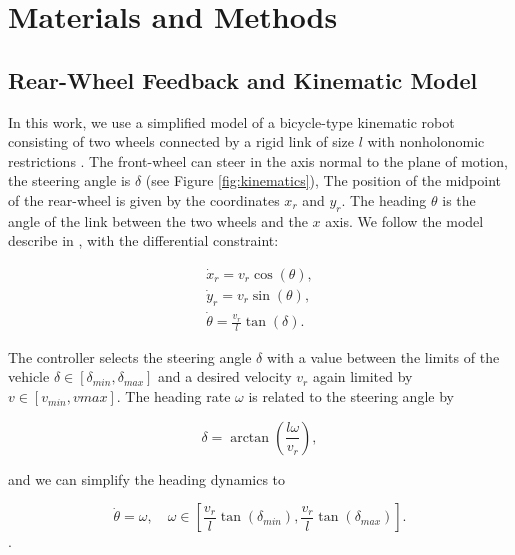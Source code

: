 \documentclass[symmetry,article,submit,moreauthors,pdftex]{Definitions/mdpi}
\begin{document}
\section{Materials and Methods}\label{MatAndMethods}

\subsection{Rear-Wheel Feedback and Kinematic Model}

In this work, we use a simplified model of a bicycle-type kinematic robot
consisting of two wheels connected by a rigid link of size $l$ with
nonholonomic restrictions \cite{pamucar_vehicle_2018,de1998feedback}.  The
front-wheel can steer in the axis normal to the plane of motion, the steering
angle is $\delta$ (see Figure \ref{fig:kinematics}), The position of the
midpoint of the rear-wheel is given by the coordinates $x_r$ and $y_r$. The
heading $\theta$ is the angle of the link between the two wheels and the $x$
axis.  We follow the model describe in \cite{paden_survey_2016}, with the
differential constraint:

\begin{equation}
    \begin{matrix}
        \dot{x}_{r}  = v_r \cos (\theta),\\ 
        \dot{y}_{r}  = v_r \sin (\theta),\\
        \dot{\theta} = \frac{v_r}{l} \tan (\delta).
    \end{matrix}
\end{equation}

The controller selects the steering angle $\delta$ with a value between the
limits of the vehicle $\delta \in [\delta_{min},\delta_{max}]$ and a desired
velocity $v_r$ again limited by $v\in [v_{min},v{max}]$. The heading rate
$\omega$ is related to the steering angle by 

\begin{equation}
       \delta = \arctan \left(\frac{l\omega}{v_r}\right),
\end{equation}

and we can simplify the heading dynamics to 

\begin{equation}
    \dot{\theta} = \omega,\quad \omega \in \left[\frac{v_r}{l} \tan(\delta_{min}),\frac{v_r}{l} \tan(\delta_{max} ) \right].
\end{equation}.
\end{document}
